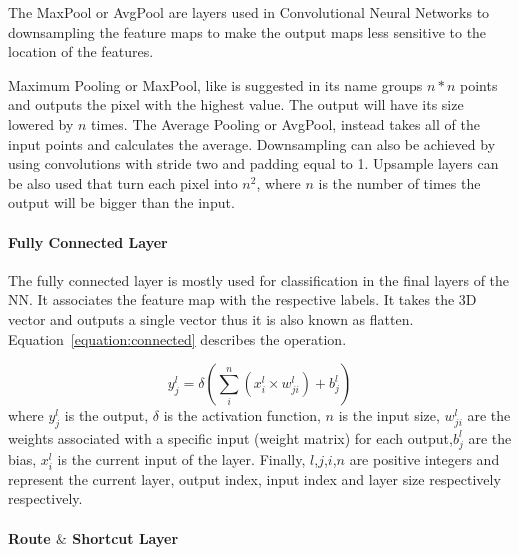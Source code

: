 \documentclass[conference]{IEEEtran}
\begin{document}
The MaxPool or AvgPool are layers used in Convolutional Neural Networks to
downsampling the feature maps to make the output maps less sensitive to the
location of the features.

Maximum Pooling or MaxPool, like is suggested in its name groups $ n * n $
points and outputs the pixel with the highest value.  The output will have its size
lowered by $n$ times.  The Average Pooling or AvgPool, instead takes all of
the input points and calculates the average. Downsampling can also be achieved
by using convolutions with stride two and padding equal to 1.  Upsample layers can
be also used that turn each pixel into $n^{2}$, where $n$ is the number of times
the output will be bigger than the input.

 

\paragraph{Fully Connected Layer}

The fully connected layer is mostly used for classification in the final layers
of the NN. It associates the feature map with the respective labels.  It takes the
3D vector and outputs a single vector thus it is also known as flatten.
Equation~\ref{equation:connected} describes the operation.

\begin{equation} \label{equation:connected}
     \displaystyle y_{j}^{l}=\delta (\sum_{i}^{n}(x_{i}^{l} \times w_{ji}^{l})+ b_{j}^{l})
\end{equation}
where $ y_{j}^{l}$ is the output, $\delta$ is the activation function, $n$ is the input size, $ w_{ji}^{l} $  are the weights associated with a specific input (weight matrix) for each output,$ b_{j}^{l}$ are the bias, $x_{i}^{l}$ is the current
input of the layer. Finally, $l$,$j$,$i$,$n$ are positive integers and represent the current layer, output index, input index and layer size respectively respectively.


\paragraph{Route $\&$ Shortcut Layer}
\end{document}
